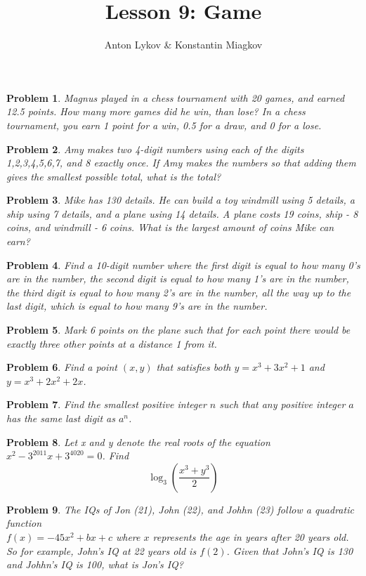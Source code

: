 \documentclass[a4paper,12pt]{article}
\author{Anton Lykov \& Konstantin Miagkov}
\title{Lesson 9: Game}
\theoremstyle{perfect}
\newtheorem{prb}{Problem}
\begin{document}
 
\setlength{\parindent}{0cm}
\maketitle

\begin{prb}
Magnus played in a chess tournament with 20 games, and earned 12.5 points.
How many more games did he win, than lose? In a chess tournament, you earn 1 point for a win, 0.5 for a draw, and 0 for a lose. 
\end{prb} 

\begin{prb}
Amy makes two 4-digit numbers using each of the digits 1,2,3,4,5,6,7, and 8 exactly once. If Amy makes the numbers so that adding them gives the smallest possible total, what is the total?
\end{prb} 

\begin{prb}
	Mike has 130 details. He can build a toy windmill using 5 details, a ship using 7 details, and a plane using 14 details. A plane costs 19 coins, ship - 8 coins, and windmill - 6 coins. What is the largest amount of coins Mike can earn?
\end{prb} 

\begin{prb}
Find a 10-digit number where the first digit is equal to how many 0's are in the number, the second digit is equal to how many 1's are in the number, the third digit is equal to how many 2's are in the number, all the way up to the last digit, which is equal to how many 9's are in the number.
\end{prb}
 
\begin{prb}
Mark 6 points on the plane such that for each point there would be exactly three other points at a distance 1 from it.
\end{prb}

\begin{prb}
Find a point $(x,y)$ that satisfies both $y = x^3 + 3x^2 + 1$ and $y = x^3 + 2x^2 + 2x$.
\end{prb}

\begin{prb}
Find the smallest positive integer $n$ such that any positive integer $a$ has the same last digit as $a^n$.
\end{prb}

\begin{prb}
Let x and y denote the real roots of the equation $x^2 - 3^{2011}x + 3^{4020} = 0$. Find $$\log_3\left(\frac{x^3 + y^3}{2}\right)$$
\end{prb}

\begin{prb}
The IQs of Jon (21), John (22), and Johhn (23) follow a quadratic function\\ $f(x) = -45x^2 + bx + c$ where $x$ represents the age in years after 20 years old. So for example, John's IQ at 22 years old is $f(2)$. Given that John's IQ is 130 and Johhn's IQ is 100, what is Jon's IQ?
\end{prb}
\end{document}
